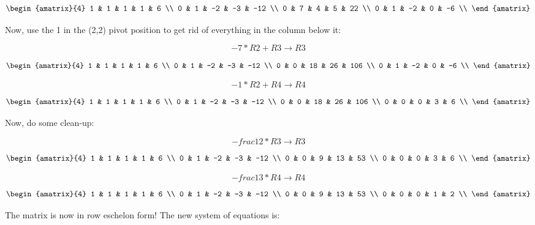 \documentclass[letterpaper, 12pt]{article}
\begin{document}
\[\begin{amatrix}{4}
1 & 1 & 1 & 1 & 6 \\
0 & 1 & -2 & -3 & -12 \\
0 & 7 & 4 & 5 & 22 \\
0 & 1 & -2 & 0 & -6 \\
\end{amatrix}\]

Now, use the 1 in the (2,2) pivot position to get rid of everything in the
column below it:

\[-7*R2+R3\to R3\]

\[\begin{amatrix}{4}
1 & 1 & 1 & 1 & 6 \\
0 & 1 & -2 & -3 & -12 \\
0 & 0 & 18 & 26 & 106 \\
0 & 1 & -2 & 0 & -6 \\
\end{amatrix}\]

\[-1*R2+R4\to R4\]

\[\begin{amatrix}{4}
1 & 1 & 1 & 1 & 6 \\
0 & 1 & -2 & -3 & -12 \\
0 & 0 & 18 & 26 & 106 \\
0 & 0 & 0 & 3 & 6 \\
\end{amatrix}\]

Now, do some clean-up:

\[-frac{1}{2}*R3\to R3\]

\[\begin{amatrix}{4}
1 & 1 & 1 & 1 & 6 \\
0 & 1 & -2 & -3 & -12 \\
0 & 0 & 9 & 13 & 53 \\
0 & 0 & 0 & 3 & 6 \\
\end{amatrix}\]

\[-frac{1}{3}*R4\to R4\]

\[\begin{amatrix}{4}
1 & 1 & 1 & 1 & 6 \\
0 & 1 & -2 & -3 & -12 \\
0 & 0 & 9 & 13 & 53 \\
0 & 0 & 0 & 1 & 2 \\
\end{amatrix}\]

The matrix is now in row eschelon form! The new system of equations is:
\end{document}
